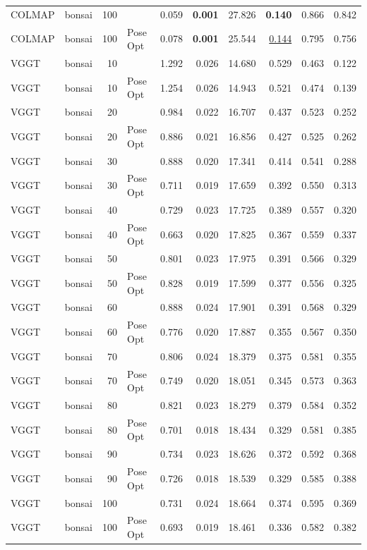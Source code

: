 \begin{table}[H]
\begin{tabular}{llrlrrrrrr}
COLMAP & bonsai & 100 &  & 0.059 & \textbf{0.001} & 27.826 & \textbf{0.140} & 0.866 & 0.842 \\
COLMAP & bonsai & 100 & Pose Opt & 0.078 & \textbf{0.001} & 25.544 & \underline{0.144} & 0.795 & 0.756 \\
VGGT & bonsai & 10 &  & 1.292 & 0.026 & 14.680 & 0.529 & 0.463 & 0.122 \\
VGGT & bonsai & 10 & Pose Opt & 1.254 & 0.026 & 14.943 & 0.521 & 0.474 & 0.139 \\
VGGT & bonsai & 20 &  & 0.984 & 0.022 & 16.707 & 0.437 & 0.523 & 0.252 \\
VGGT & bonsai & 20 & Pose Opt & 0.886 & 0.021 & 16.856 & 0.427 & 0.525 & 0.262 \\
VGGT & bonsai & 30 &  & 0.888 & 0.020 & 17.341 & 0.414 & 0.541 & 0.288 \\
VGGT & bonsai & 30 & Pose Opt & 0.711 & 0.019 & 17.659 & 0.392 & 0.550 & 0.313 \\
VGGT & bonsai & 40 &  & 0.729 & 0.023 & 17.725 & 0.389 & 0.557 & 0.320 \\
VGGT & bonsai & 40 & Pose Opt & 0.663 & 0.020 & 17.825 & 0.367 & 0.559 & 0.337 \\
VGGT & bonsai & 50 &  & 0.801 & 0.023 & 17.975 & 0.391 & 0.566 & 0.329 \\
VGGT & bonsai & 50 & Pose Opt & 0.828 & 0.019 & 17.599 & 0.377 & 0.556 & 0.325 \\
VGGT & bonsai & 60 &  & 0.888 & 0.024 & 17.901 & 0.391 & 0.568 & 0.329 \\
VGGT & bonsai & 60 & Pose Opt & 0.776 & 0.020 & 17.887 & 0.355 & 0.567 & 0.350 \\
VGGT & bonsai & 70 &  & 0.806 & 0.024 & 18.379 & 0.375 & 0.581 & 0.355 \\
VGGT & bonsai & 70 & Pose Opt & 0.749 & 0.020 & 18.051 & 0.345 & 0.573 & 0.363 \\
VGGT & bonsai & 80 &  & 0.821 & 0.023 & 18.279 & 0.379 & 0.584 & 0.352 \\
VGGT & bonsai & 80 & Pose Opt & 0.701 & 0.018 & 18.434 & 0.329 & 0.581 & 0.385 \\
VGGT & bonsai & 90 &  & 0.734 & 0.023 & 18.626 & 0.372 & 0.592 & 0.368 \\
VGGT & bonsai & 90 & Pose Opt & 0.726 & 0.018 & 18.539 & 0.329 & 0.585 & 0.388 \\
VGGT & bonsai & 100 &  & 0.731 & 0.024 & 18.664 & 0.374 & 0.595 & 0.369 \\
VGGT & bonsai & 100 & Pose Opt & 0.693 & 0.019 & 18.461 & 0.336 & 0.582 & 0.382 \\
\bottomrule
\end{tabular}
\end{table}
